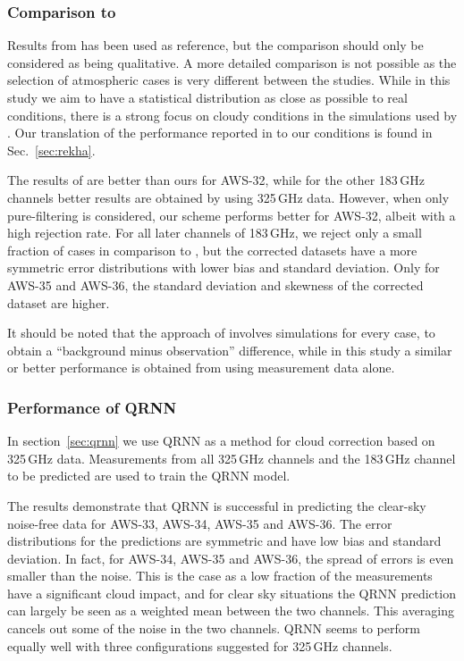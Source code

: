 \documentclass[12pt]{article}
\begin{document}
\subsubsection{Comparison to \citet{rekha2012potential}}
%
Results from \citet{rekha2012potential} has been used as reference, but the
comparison should only be considered as being qualitative. A more detailed
comparison is not possible as the selection of atmospheric cases is very
different between the studies. While in this study we aim to have a statistical
distribution as close as possible to real conditions, there is a strong focus on
cloudy conditions in the simulations used by \citet{rekha2012potential}. Our
translation of the performance reported in \citet{rekha2012potential} to our
conditions is found in Sec.~\ref{sec:rekha}.

The results of \citet{rekha2012potential} are better than ours for AWS-32, while
for the other 183\,GHz channels better results are obtained by using 325\,GHz
data. However, when only pure-filtering is considered, our scheme performs
better for AWS-32, albeit with a high rejection rate. For all later channels of
183\,GHz, we reject only a small fraction of cases in comparison to
\citet{rekha2012potential}, but the corrected datasets have a more symmetric error
distributions with lower bias and standard deviation. Only for AWS-35 and AWS-36,
the standard deviation and skewness of the corrected dataset are higher.

It should be noted that the approach of \citet{rekha2012potential} involves
simulations for every case, to obtain a ``background minus observation''
difference, while in this study a similar or better performance is obtained
from using measurement data alone. 

\subsubsection{Performance of QRNN}
In section~\ref{sec:qrnn} we use QRNN as a method for cloud correction based on
325\,GHz data. Measurements from all 325\,GHz channels and the 183\,GHz channel
to be predicted are used to train the QRNN model.

The results demonstrate that QRNN is successful in predicting the clear-sky
noise-free data for AWS-33, AWS-34, AWS-35 and AWS-36. The error distributions
for the predictions are symmetric and have low bias and standard deviation. In
fact, for AWS-34, AWS-35 and AWS-36, the spread of errors is even smaller than
the noise. This is the case as a low fraction of the measurements have a
significant cloud impact, and for clear sky situations the QRNN prediction can
largely be seen as a weighted mean between the two channels. This averaging
cancels out some of the noise in the two channels. QRNN seems to perform
equally well with three configurations suggested for 325\,GHz channels.
\end{document}
